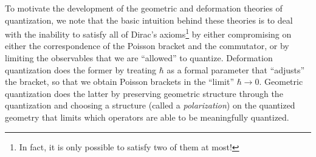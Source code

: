 \documentclass{tufte-handout}
\begin{document}
To motivate the development of the geometric and deformation theories of quantization, we note that the basic intuition behind these theories is to deal with the inability to satisfy all of Dirac's axioms\footnote{In fact, it is only possible to satisfy two of them at most!} by either compromising on either the correspondence of the Poisson bracket and the commutator, or by limiting the observables that we are ``allowed'' to quantize. Deformation quantization does the former by treating $\hbar$ as a formal parameter that ``adjusts'' the bracket, so that we obtain Poisson brackets in the ``limit'' $\hbar \to 0$. Geometric quantization does the latter by preserving geometric structure through the quantization and choosing a structure (called a \emph{polarization}) on the quantized geometry that limits which operators are able to be meaningfully quantized.


\end{document}

